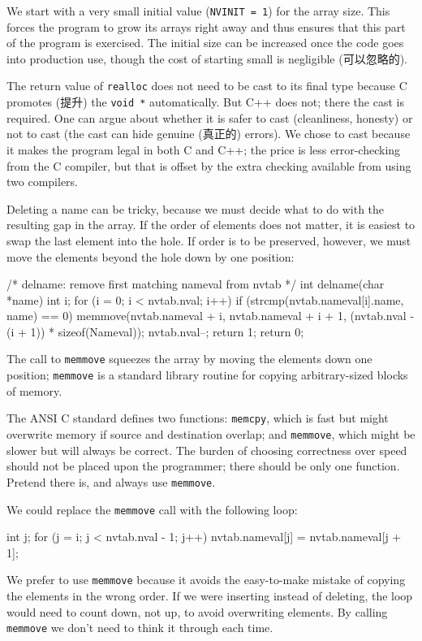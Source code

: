 We start with a very small initial value (\verb'NVINIT = 1') for the array
size.  This forces the program to grow its arrays right away and thus
ensures that this part of the program is exercised. The initial size can be
increased once the code goes into production use, though the cost of
starting small is negligible (可以忽略的).

The return value of \verb'realloc' does not need to be cast to its final
type because C promotes (提升) the \verb'void *' automatically. But C++
does not; there the cast is required. One can argue about whether it is
safer to cast (cleanliness, honesty) or not to cast (the cast can hide
genuine (真正的) errors).  We chose to cast because it makes the program
legal in both C and C++; the price is less error-checking from the C
compiler, but that is offset by the extra checking available from using two
compilers.

Deleting a name can be tricky, because we must decide what to do with the
resulting gap in the array. If the order of elements does not matter, it is
easiest to swap the last element into the hole. If order is to be
preserved, however, we must move the elements beyond the hole down by one
position:
\begin{wellcode}
    /* delname: remove first matching nameval from nvtab */
    int delname(char *name)
    {
        int i;
        for (i = 0; i < nvtab.nval; i++)
            if (strcmp(nvtab.nameval[i].name, name) == 0) {
                memmove(nvtab.nameval + i, nvtab.nameval + i + 1,
                             (nvtab.nval - (i + 1)) * sizeof(Nameval));
                nvtab.nval--;
                return 1;
            }
        return 0;
    }
\end{wellcode}
The call to \verb'memmove' squeezes the array by moving the elements down
one position; \verb'memmove' is a standard library routine for copying
arbitrary-sized blocks of memory.

The ANSI C standard defines two functions: \verb'memcpy', which is fast but
might overwrite memory if source and destination overlap; and
\verb'memmove', which might be slower but will always be correct. The
burden of choosing correctness over speed should not be placed upon the
programmer; there should be only one function. Pretend there is, and always
use \verb'memmove'.

We could replace the \verb'memmove' call with the following loop:
\begin{wellcode}
    int j;
    for (j = i; j < nvtab.nval - 1; j++)
        nvtab.nameval[j] = nvtab.nameval[j + 1];
\end{wellcode}
We prefer to use \verb'memmove' because it avoids the easy-to-make mistake
of copying the elements in the wrong order. If we were inserting instead of
deleting, the loop would need to count down, not up, to avoid overwriting
elements. By calling \verb'memmove' we don't need to think it through each
time.

